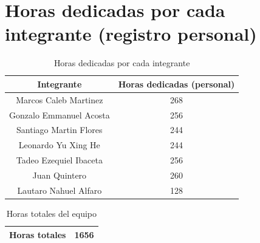     \section{Horas dedicadas por cada integrante (registro personal)}

   \begin{table}[H]
    \centering
    \begin{tabular}{|c|c|}
        \hline
        \textbf{Integrante} & \textbf{Horas dedicadas (personal)}\\
        \hline
        Marcos Caleb Martinez & 268 \\ %
        \hline
        Gonzalo Emmanuel Acosta & 256  \\ 
        \hline
        Santiago Martin Flores & 244  \\ 
        \hline
        Leonardo Yu Xing He & 244  \\ 
        \hline
        Tadeo Ezequiel Ibaceta & 256  \\ 
        \hline
        Juan Quintero & 260 \\ 
        \hline
        Lautaro Nahuel Alfaro & 128\\ 
        \hline
    \end{tabular}
    \caption{Horas dedicadas por cada integrante}
    \end{table}

    \begin{table}[H]
    \centering
    \begin{tabular}{|c|c|}
        \hline
        \textbf{Horas totales} & 1656\\
        \hline
    \end{tabular}
    \caption{Horas totales del equipo}
    \end{table}
    
    
   


        